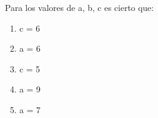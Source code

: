 {
Para los valores de a, b, c  es cierto que:
\begin{enumerate}
	\item c = 6 %
	\item a = 6
	\item c = 5 
	\item a = 9 %
	\item a = 7
\end{enumerate}
}
